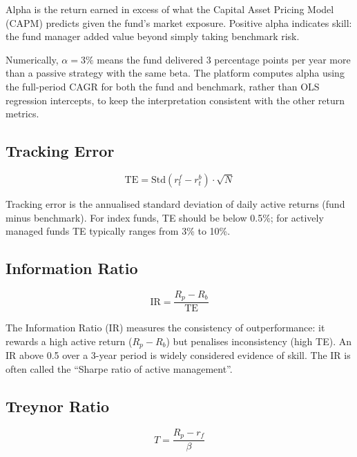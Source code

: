 \documentclass[12pt, a4paper]{article}
\newcommand{\rf}{r_f}
\newcommand{\Std}{\mathrm{Std}}
\begin{document}
\begin{interpretation}
Alpha is the return earned in excess of what the Capital Asset Pricing
Model (CAPM) predicts given the fund's market exposure.  Positive alpha
indicates skill: the fund manager added value beyond simply taking
benchmark risk.

Numerically, $\alpha = 3\%$ means the fund delivered 3 percentage points
per year more than a passive strategy with the same beta.  The platform
computes alpha using the full-period CAGR for both the fund and benchmark,
rather than OLS regression intercepts, to keep the interpretation consistent
with the other return metrics.
\end{interpretation}

\subsection{Tracking Error}

\begin{definition}
\[
  \mathrm{TE} = \Std(r_t^f - r_t^b) \cdot \sqrt{N}
\]
\end{definition}

Tracking error is the annualised standard deviation of daily active returns
(fund minus benchmark).  For index funds, TE should be below 0.5\%; for
actively managed funds TE typically ranges from 3\% to 10\%.

\subsection{Information Ratio}

\begin{definition}
\[
  \mathrm{IR} = \frac{R_p - R_b}{\mathrm{TE}}
\]
\end{definition}

The Information Ratio (IR) measures the consistency of outperformance: it
rewards a high active return ($R_p - R_b$) but penalises inconsistency
(high TE).  An IR above 0.5 over a 3-year period is widely considered
evidence of skill.  The IR is often called the ``Sharpe ratio of active
management''.

\subsection{Treynor Ratio}

\begin{definition}
\[
  T = \frac{R_p - \rf}{\beta}
\]
\end{definition}
\end{document}
